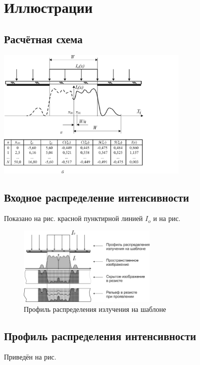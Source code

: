 \documentclass[14pt,a4paper]{extarticle}
\begin{document}
\section{Иллюстрации}
\subsection{Расчётная схема}
\begin{center}
	\includegraphics[trim = 0 80 70 0,clip, width=0.7\textwidth]{scheme.jpg}
\end{center}
\subsection{Входное распределение интенсивности}
Показано на рис.  красной пунктирной линией $I_o$ и на рис. 
\begin{center}
	\begin{figure}[H]
		\centering
		\includegraphics[trim=0 185 220 0,clip,width=0.6\textwidth]{vhod.jpg}
		\caption{Профиль распределения излучения на шаблоне}\label{vhod}
	\end{figure}
\end{center}

\subsection{Профиль распределения интенсивности}
Приведён на рис. 
\end{document}
